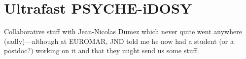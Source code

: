 \section{Ultrafast PSYCHE-iDOSY}
\label{sec:pureshift__epsidosy}

Collaborative stuff with Jean-Nicolas Dumez which never quite went anywhere (sadly)---although at EUROMAR, JND told me he now had a student (or a postdoc?) working on it and that they might send us some stuff.
